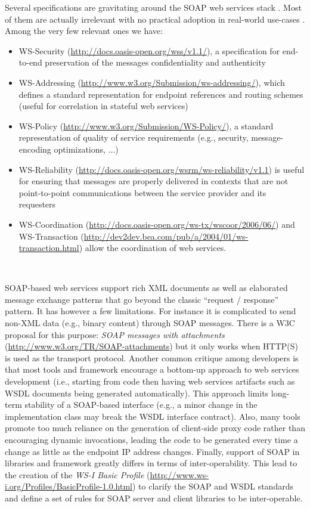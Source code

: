 Several specifications are gravitating around the SOAP web services stack \cite{HMBBFC+06}. Most of them are actually irrelevant with no practical adoption in real-world use-cases \cite{WS-standards}. Among the very few relevant ones we have:
\begin{itemize}
  
  \item WS-Security (\url{http://docs.oasis-open.org/wss/v1.1/}), a specification for end-to-end preservation of the messages confidentiality and authenticity
  
  \item WS-Addressing (\url{http://www.w3.org/Submission/ws-addressing/}), which defines a standard representation for endpoint references and routing schemes (useful for correlation in stateful web services)
  
  \item WS-Policy (\url{http://www.w3.org/Submission/WS-Policy/}), a standard representation of quality of service requirements (e.g., security, message-encoding optimizations, ...)
  
  \item WS-Reliability (\url{http://docs.oasis-open.org/wsrm/ws-reliability/v1.1}) is useful for ensuring that messages are properly delivered in contexts that are not point-to-point communications between the service provider and its requesters
  
  \item WS-Coordination (\url{http://docs.oasis-open.org/ws-tx/wscoor/2006/06/}) and WS-Transaction (\url{http://dev2dev.bea.com/pub/a/2004/01/ws-transaction.html}) allow the coordination of web services.
  
\end{itemize}\

SOAP-based web services support rich XML documents as well as elaborated message exchange patterns that go beyond the classic ``request / response'' pattern. It has however a few limitations. For instance it is complicated to send non-XML data (e.g., binary content) through SOAP messages. There is a W3C proposal for this purpose: \emph{SOAP messages with attachments} (\url{http://www.w3.org/TR/SOAP-attachments}) but it only works when HTTP(S) is used as the transport protocol. Another common critique among developers is that most tools and framework encourage a bottom-up approach to web services development (i.e., starting from code then having web services artifacts such as WSDL documents being generated automatically). This approach limits long-term stability of a SOAP-based interface (e.g., a minor change in the implementation class may break the WSDL interface contract). Also, many tools promote too much reliance on the generation of client-side proxy code rather than encouraging dynamic invocations, leading the code to be generated every time a change as little as the endpoint IP address changes. Finally, support of SOAP in libraries and framework greatly differs in terms of inter-operability. This lead to the creation of the \emph{WS-I Basic Profile} (\url{http://www.ws-i.org/Profiles/BasicProfile-1.0.html}) to clarify the SOAP and WSDL standards and define a set of rules for SOAP server and client libraries to be inter-operable.\\

